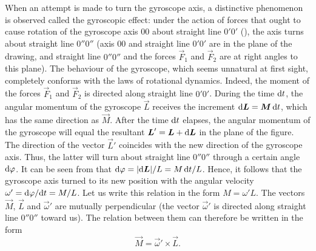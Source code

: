 When an attempt is made to turn the gyroscope axis, a distinctive phenomenon is observed called the gyroscopic effect: under the action of forces that ought to cause rotation of the gyroscope axis $00$ about straight line $0'0'$ (), the axis turns about straight line $0''0''$ (axis $00$ and straight line $0'0'$ are in the plane of the drawing, and straight line $0''0''$ and the forces $\vec{F}_1$ and $\vec{F}_2$ are at right angles to this plane). The behaviour of the gyroscope, which seems unnatural at first sight, completely conforms with the laws of rotational dynamics. Indeed, the moment of the forces $\vec{F}_1$ and $\vec{F}_2$ is directed along straight line $0'0'$. During the time $\mathrm{d} t$, the angular momentum of the gyroscope $\vec{L}$ receives the increment $\mathrm{d}\boldsymbol{L}=\boldsymbol{M}\,\mathrm{d} t$, which has the same direction as $\vec{M}$. After the time $\mathrm{d} t$ elapses, the angular momentum of the gyroscope will equal the resultant $\boldsymbol{L}'=\boldsymbol{L}+\mathrm{d}\boldsymbol{L}$ in the plane of the figure. The direction of the vector $\vec{L}'$ coincides with the new direction of the gyroscope axis. Thus, the latter will turn about straight line $0''0''$ through a certain angle $\mathrm{d}\varphi$. It can be seen from  that $\mathrm{d}\varphi=|\mathrm{d}\boldsymbol{L}|/L=M\,\mathrm{d} t/L$. Hence, it follows that the gyroscope axis turned to its new position with the angular velocity $\omega'=\mathrm{d}\varphi/\mathrm{d} t=M/L$. Let us write this relation in the form $M=\omega'L$. The vectors $\vec{M}$, $\vec{L}$ and $\vec{\omega}'$ are mutually perpendicular (the vector $\vec{\omega}'$ is directed along straight line $0''0''$ toward us). The relation between them can therefore be written in the form
\begin{equation}\label{eq:5_69}
	\vec{M} = \vec{\omega}' \times \vec{L}.
\end{equation}

